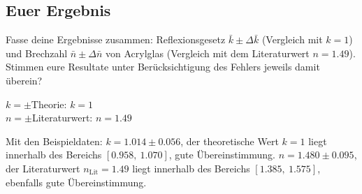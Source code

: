 \documentclass[11pt,a4paper]{article}
\newcommand{\zeichenraum}[1][4.5cm]{%
  \par\vspace{4pt}\noindent
  \fbox{\begin{minipage}[t][#1][t]{\dimexpr\linewidth-2\fboxsep-2\fboxrule}\ \end{minipage}}
  \vspace{4pt}
}
\begin{document}
\subsection{Euer Ergebnis}
\begin{aufgabebox}[{ (Fazit)}]
Fasse deine Ergebnisse zusammen: Reflexionsgesetz $\bar k\pm\Delta\bar k$ (Vergleich mit $k=1$) und Brechzahl $\bar n\pm\Delta\bar n$ von Acrylglas (Vergleich mit dem Literaturwert $n=1.49$). Stimmen eure Resultate unter Berücksichtigung des Fehlers jeweils damit überein?
\end{aufgabebox}
\vspace{2pt}
\noindent $k = $\dotfill $\pm$\dotfill \hfill Theorie: $k = 1$\\[6pt]
\noindent $n = $\dotfill $\pm$\dotfill \hfill Literaturwert: $n = 1.49$\\[10pt]
\zeichenraum[4.8cm]
\begin{solution}
\begin{loesungbox}
Mit den Beispieldaten: $k = 1.014\pm0.056$, der theoretische Wert $k=1$ liegt innerhalb des Bereichs $[0.958,\ 1.070]$, gute Übereinstimmung. $n = 1.480\pm0.095$, der Literaturwert $n_{\text{Lit}}=1.49$ liegt innerhalb des Bereichs $[1.385,\ 1.575]$, ebenfalls gute Übereinstimmung.
\end{loesungbox}
\end{solution}
\end{document}
